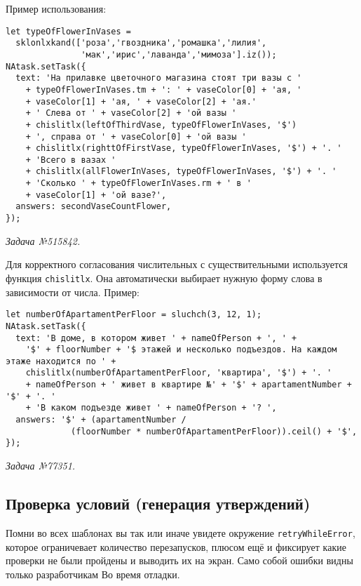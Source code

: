 Пример использования:
\begin{lstlisting}
let typeOfFlowerInVases =
  sklonlxkand(['роза','гвоздника','ромашка','лилия',
               'мак','ирис','лаванда','мимоза'].iz());
NAtask.setTask({
  text: 'На прилавке цветочного магазина стоят три вазы с '
    + typeOfFlowerInVases.tm + ': ' + vaseColor[0] + 'ая, '
    + vaseColor[1] + 'ая, ' + vaseColor[2] + 'ая.' 
    + ' Слева от ' + vaseColor[2] + 'ой вазы '
    + chislitlx(leftOfThirdVase, typeOfFlowerInVases, '$')
    + ', справа от ' + vaseColor[0] + 'ой вазы '
    + chislitlx(righttOfFirstVase, typeOfFlowerInVases, '$') + '. '
    + 'Всего в вазах '
    + chislitlx(allFlowerInVases, typeOfFlowerInVases, '$') + '. '
    + 'Сколько ' + typeOfFlowerInVases.rm + ' в '
    + vaseColor[1] + 'ой вазе?',
  answers: secondVaseCountFlower,
});
\end{lstlisting}
\textsl{Задача №515842.}

 

Для корректного согласования числительных с существительными используется функция \texttt{chislitlx}. Она автоматически выбирает нужную форму слова в зависимости от числа.  
Пример:
\begin{lstlisting}
let numberOfApartamentPerFloor = sluchch(3, 12, 1);
NAtask.setTask({
  text: 'В доме, в котором живет ' + nameOfPerson + ', ' +
    '$' + floorNumber + '$ этажей и несколько подъездов. На каждом этаже находится по ' +
    chislitlx(numberOfApartamentPerFloor, 'квартира', '$') + '. '
    + nameOfPerson + ' живет в квартире №' + '$' + apartamentNumber + '$' + '. '
    + 'В каком подъезде живет ' + nameOfPerson + '? ',
  answers: '$' + (apartamentNumber /
             (floorNumber * numberOfApartamentPerFloor)).ceil() + '$',
});
\end{lstlisting}
\textsl{Задача №77351.}

\subsection{Проверка условий (генерация утверждений)}

Помни во всех шаблонах вы так или иначе увидете окружение \texttt{retryWhileError}, которое ограничевает количество перезапусков, плюсом ещё и фиксирует какие проверки не были пройдены и выводить их на экран. Само собой ошибки видны только разработчикам Во время отладки.

